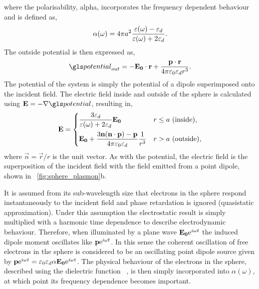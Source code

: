 \documentclass{article}
\begin{document}
where the polarisability, \gls{alpha}, incorporates the frequency dependent behaviour and is defined as,
\begin{equation}
	\alpha(\omega) = 4\pi a^2 \frac{\varepsilon(\omega) - \varepsilon_d}{\varepsilon(\omega) + 2\varepsilon_d}.
	\label{eq:polarisability}
\end{equation}
The outside potential is then expressed as,
\begin{equation}
	\pot_{out} = -\vec{E_0}\cdot\vec{r} + \frac{\vec{p}\cdot\vec{r}}{4\pi\epsfs\epsdi r^3}.
\end{equation}
The potential of the system is simply the potential of a dipole superimposed onto the incident field. The electric field inside and outside of the sphere is calculated using $\vec{E}=-\nabla\pot$, resulting in,
\begin{equation}
	\mathbf{E} =
	\begin{dcases}
	\frac{3\varepsilon_d}{\varepsilon(\omega)+2\varepsilon_d} \mathbf{E_0} & r \leq a\text{ (inside)}, \\
	\mathbf{E_0} + \frac{3\mathbf{n}(\mathbf{n}\cdot\mathbf{p}) - \mathbf{p}}{4\pi\varepsilon_0\varepsilon_d}\frac{1}{r^3} & r > a\text{ (outside)},
	\end{dcases}
	\label{eq:E_out}
\end{equation}
where $\vec{n}=\vec{r}/r$ is the unit vector. As with the potential, the electric field is the superposition of the incident field with the field emitted from a point dipole, shown in \figurename~\ref{fig:sphere_plasmon}b.

It is assumed from its sub-wavelength size that electrons in the sphere respond instantaneously to the incident field and phase retardation is ignored (quasistatic approximation). Under this assumption the electrostatic result is simply multiplied with a harmonic time dependence to describe electrodynamic behaviour. Therefore, when illuminated by a plane wave $\mathbf{E_0}\mathrm{e}^{i\omega t}$ the induced dipole moment oscillates like $\mathbf{p}\mathrm{e}^{i\omega t}$. In this sense the coherent oscillation of free electrons in the sphere is considered to be an oscillating point dipole source given by $\mathbf{p}\mathrm{e}^{i\omega t}=\varepsilon_0\varepsilon_d\alpha\mathbf{E_0}\mathrm{e}^{i\omega t}$. The physical behaviour of the electrons in the sphere, described using the dielectric function \dielectric\ , is then simply incorporated into $\alpha(\omega)$, at which point its frequency dependence becomes important.
\end{document}

